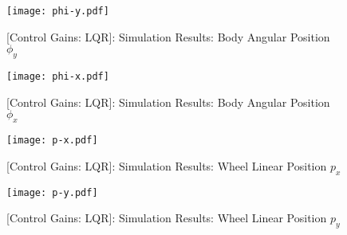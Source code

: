 \documentclass[crop=false,float=true,class=scrreprt]{standalone}
\begin{document}
\clearpage





\vspace*{\fill}
\begin{figure}[H]%
\centering%
\texttt{[image: phi-y.pdf]}%
\caption[{[Control Gains: LQR]: Simulation Results: Body Angular Position $\phi_{y}$}]%
        {{[Control Gains: LQR]: Simulation Results: Body Angular Position $\phi_{y}$%
          \label{FIG:controllerDesign:additionalDynamics:optimal:results:simulation:phiY}%
        }}%
\end{figure}
\vspace*{\fill}




\clearpage





\vspace*{\fill}
\begin{figure}[H]%
\centering%
\texttt{[image: phi-x.pdf]}%
\caption[{[Control Gains: LQR]: Simulation Results: Body Angular Position $\phi_{x}$}]%
        {{[Control Gains: LQR]: Simulation Results: Body Angular Position $\phi_{x}$%
          \label{FIG:controllerDesign:additionalDynamics:optimal:results:simulation:phiX}%
        }}%
\end{figure}
\vspace*{\fill}




\clearpage





\vspace*{\fill}
\begin{figure}[H]%
\centering%
\texttt{[image: p-x.pdf]}%
\caption[{[Control Gains: LQR]: Simulation Results: Wheel Linear Position $p_{x}$}]%
        {{[Control Gains: LQR]: Simulation Results: Wheel Linear Position $p_{x}$%
          \label{FIG:controllerDesign:additionalDynamics:optimal:results:simulation:pX}%
        }}%
\end{figure}
\vspace*{\fill}




\clearpage





\vspace*{\fill}
\begin{figure}[H]%
\centering%
\texttt{[image: p-y.pdf]}%
\caption[{[Control Gains: LQR]: Simulation Results: Wheel Linear Position $p_{y}$}]%
        {{[Control Gains: LQR]: Simulation Results: Wheel Linear Position $p_{y}$%
          \label{FIG:controllerDesign:additionalDynamics:optimal:results:simulation:pY}%
        }}%
\end{figure}
\vspace*{\fill}
\end{document}
